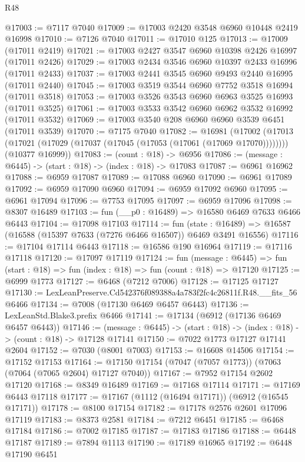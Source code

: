\begin{lexlean}{R48}
\begin{coremodule}
@17003 := @7117 @7040
@17009 := @17003 @2420 @3548 @6960 @10448 @2419 @16998
@17010 := @7126 @7040
@17011 := @17010 @125
@17013 := @17009 (@17011 @2419)
@17021 := @17003 @2427 @3547 @6960 @10398 @2426 @16997 (@17011 @2426)
@17029 := @17003 @2434 @3546 @6960 @10397 @2433 @16996 (@17011 @2433)
@17037 := @17003 @2441 @3545 @6960 @9493 @2440 @16995 (@17011 @2440)
@17045 := @17003 @3519 @3544 @6960 @7752 @3518 @16994 (@17011 @3518)
@17053 := @17003 @3526 @3543 @6960 @6963 @3525 @16993 (@17011 @3525)
@17061 := @17003 @3533 @3542 @6960 @6962 @3532 @16992 (@17011 @3532)
@17069 := @17003 @3540 @208 @6960 @6960 @3539 @6451 (@17011 @3539)
@17070 := @7175 @7040
@17082 := @16981
    (@17002
      (@17013 (@17021 (@17029 (@17037 (@17045 (@17053 (@17061 (@17069 @17070))))))))
      (@10377 @16999))
@17083 := (count : @18) -> @6956
@17086 := (message : @6445) -> (start : @18) -> (index : @18) -> @17083
@17087 := @6961 @16962
@17088 := @6959 @17087
@17089 := @17088 @6960
@17090 := @6961 @17089
@17092 := @6959 @17090 @6960
@17094 := @6959 @17092 @6960
@17095 := @6961 @17094
@17096 := @7753 @17095
@17097 := @6959 @17096
@17098 := @8307 @16489
@17103 := fun (__p0 : @16489) => @16580 @6469 @7633 @6466 @6443
@17104 := @17098 @17103
@17114 := fun (state : @16489) =>
  @16587 (@16588 (@15397 @7633 (@7276 @6466 @16507)) @6469 @3491 @16556)
@17116 := @17104 @17114 @6443
@17118 := @16586 @190 @16964
@17119 := @17116 @17118
@17120 := @17097 @17119
@17124 := fun (message : @6445) =>
  fun (start : @18) => fun (index : @18) => fun (count : @18) => @17120
@17125 := @6999 @1773
@17127 := @6468 (@7212 @7006)
@17128 := @17125 @17127
@17130 := LexLeanPreserve.Cd542376f089388a4a783f2fc4c26811f.R48.__fits_56 @6466
@17134 := @7008 (@17130 @6469 @6457 @6443)
@17136 := LexLeanStd.Blake3.prefix @6466
@17141 := @17134 (@6912 (@17136 @6469 @6457 @6443))
@17146 := (message : @6445) -> (start : @18) -> (index : @18) -> (count : @18) -> @17128 @17141
@17150 := @7022 @1773 @17127 @17141 @2604
@17152 := @7030 (@8001 @7003)
@17153 := @16608 @14506
@17154 := @17152 @17153
@17164 := @17150 @17154 (@7047 (@7057 @1773)) (@7063 (@7064 (@7065 @2604) @17127 @7040))
@17167 := @7952 @17154 @2602 @17120
@17168 := @8349 @16489
@17169 := @17168 @17114
@17171 := @17169 @6443 @17118
@17177 := @17167 (@1112 (@16494 @17171)) (@6912 (@16545 @17171))
@17178 := @8100 @17154
@17182 := @17178 @2576 @2601 @17096 @17119
@17183 := @8373 @2581
@17184 := @7212 @6451
@17185 := @6468 @17184
@17186 := @7002 @17185
@17187 := @17183 @17186
@17188 := @6448 @17187
@17189 := @7894 @1113
@17190 := @17189 @16965
@17192 := @6448 @17190 @6451

\end{coremodule}
\end{lexlean}
